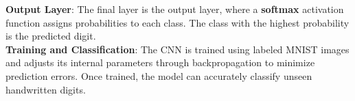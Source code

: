 \textbf{Output Layer}:
The final layer is the output layer, where a \textbf{softmax} activation function assigns probabilities to each class. The class with the highest probability is the predicted digit.\\

\textbf{Training and Classification}:
The CNN is trained using labeled MNIST images and adjusts its internal parameters through backpropagation to minimize prediction errors. Once trained, the model can accurately classify unseen handwritten digits.


